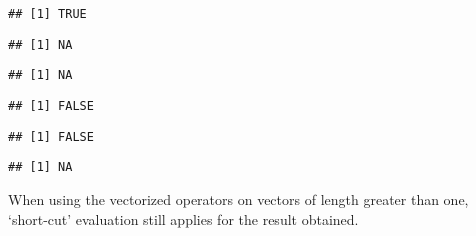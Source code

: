 \documentclass[paper=a4,10pt,div=17,headsepline,BCOR=12mm,twoside,open=right]{scrbook}\usepackage{knitr}
\begin{document}
\begin{knitrout}\footnotesize
{}\color{fgcolor}\begin{kframe}
\begin{alltt}
 \hlopt{||} 
\end{alltt}
\begin{verbatim}
## [1] TRUE
\end{verbatim}
\begin{alltt}
 \hlopt{||} 
\end{alltt}
\begin{verbatim}
## [1] NA
\end{verbatim}
\begin{alltt}
 \hlopt{&&} 
\end{alltt}
\begin{verbatim}
## [1] NA
\end{verbatim}
\begin{alltt}
 \hlopt{&&} 
\end{alltt}
\begin{verbatim}
## [1] FALSE
\end{verbatim}
\begin{alltt}
 \hlopt{&&}  \hlopt{&&} 
\end{alltt}
\begin{verbatim}
## [1] FALSE
\end{verbatim}
\begin{alltt}
 \hlopt{&&}  \hlopt{&&} 
\end{alltt}
\begin{verbatim}
## [1] NA
\end{verbatim}
\end{kframe}
\end{knitrout}

When using the vectorized operators on vectors of length greater than one, `short-cut' evaluation still applies for the result obtained.
\end{document}

